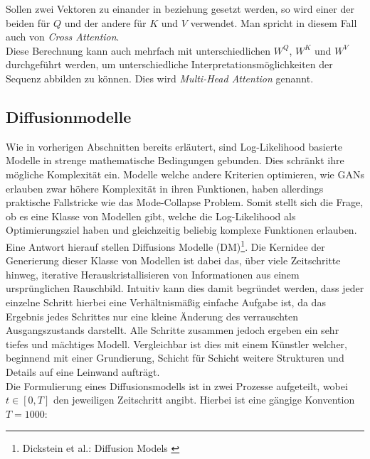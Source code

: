 Sollen zwei Vektoren zu einander in beziehung gesetzt werden, so wird einer der beiden für $Q$ und der andere für $K$ und $V$ verwendet. Man spricht in diesem Fall auch von \textit{Cross Attention}. \\
Diese Berechnung kann auch mehrfach mit unterschiedlichen $W^Q$, $W^K$ und $W^V$ durchgeführt werden, um unterschiedliche Interpretationsmöglichkeiten der Sequenz abbilden zu können. Dies wird \textit{Multi-Head Attention} genannt.

\subsection{Diffusionmodelle}

Wie in vorherigen Abschnitten bereits erläutert, sind Log-Likelihood basierte Modelle in strenge mathematische Bedingungen gebunden. Dies schränkt ihre mögliche Komplexität ein. Modelle welche andere Kriterien optimieren, wie GANs erlauben zwar höhere Komplexität in ihren Funktionen, haben allerdings praktische Fallstricke wie das Mode-Collapse Problem. Somit stellt sich die Frage, ob es eine Klasse von Modellen gibt, welche die Log-Likelihood als Optimierungsziel haben und gleichzeitig beliebig komplexe Funktionen erlauben. \\
Eine Antwort hierauf stellen Diffusions Modelle (DM)\footnote{
    Dickstein et al.: Diffusion Models
    \cite{pmlr-v37-sohl-dickstein15}
}. Die Kernidee der Generierung dieser Klasse von Modellen ist dabei das, über viele Zeitschritte hinweg, iterative Herauskristallisieren von Informationen aus einem ursprünglichen Rauschbild. Intuitiv kann dies damit begründet werden, dass jeder einzelne Schritt hierbei eine Verhältnismäßig einfache Aufgabe ist, da das Ergebnis jedes Schrittes nur eine kleine Änderung des verrauschten Ausgangszustands darstellt. Alle Schritte zusammen jedoch ergeben ein sehr tiefes und mächtiges Modell. Vergleichbar ist dies mit einem Künstler welcher, beginnend mit einer Grundierung, Schicht für Schicht weitere Strukturen und Details auf eine Leinwand aufträgt. \\
Die Formulierung eines Diffusionsmodells ist in zwei Prozesse aufgeteilt, wobei $t \in [0,T]$ den jeweiligen Zeitschritt angibt. Hierbei ist eine gängige Konvention $T=1000$: 
